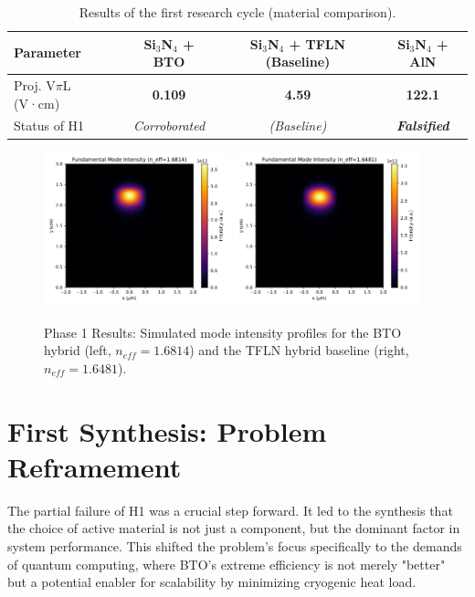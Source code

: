\documentclass[12pt, a4paper, numbers]{report}
\begin{document}
\begin{table}[htbp]
\caption{Results of the first research cycle (material comparison).}
\label{tab:cycle1}
\centering
\begin{tabular}{lccc}
\toprule
\textbf{Parameter} & \textbf{Si$_3$N$_4$ + BTO} & \textbf{Si$_3$N$_4$ + TFLN (Baseline)} & \textbf{Si$_3$N$_4$ + AlN} \\
\midrule
Proj. V$\pi$L (V·cm) & \textbf{0.109} & \textbf{4.59} & \textbf{122.1} \\
Status of H1 & \textit{Corroborated} & \textit{(Baseline)} & \textbf{\textit{Falsified}} \\
\bottomrule
\end{tabular}
\end{table}

\begin{figure}[htbp]
    \centering
    \includegraphics[width=0.48\textwidth]{simulation_intensity_BTO.pdf}
    \includegraphics[width=0.48\textwidth]{simulation_intensity_TFLN.pdf}
    \caption{Phase 1 Results: Simulated mode intensity profiles for the BTO hybrid (left, $n_{eff}=1.6814$) and the TFLN hybrid baseline (right, $n_{eff}=1.6481$).}
    \label{fig:cycle1_modes}
\end{figure}

\section{First Synthesis: Problem Reframement}
The partial failure of H1 was a crucial step forward. It led to the synthesis that the choice of active material is not just a component, but the dominant factor in system performance. This shifted the problem's focus specifically to the demands of quantum computing, where BTO's extreme efficiency is not merely "better" but a potential enabler for scalability by minimizing cryogenic heat load.
\end{document}
